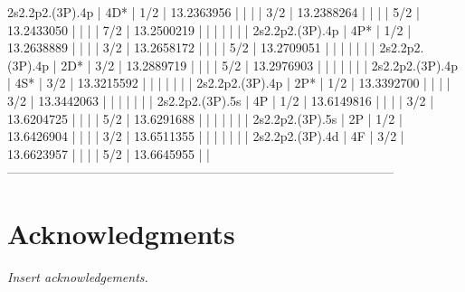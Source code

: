 \begin{table}
\begin{verbbox}
2s2.2p2.(3P).4p    | 4D*    |  1/2 |          13.2363956   |                    |          
                   |        |  3/2 |          13.2388264   |                    |          
                   |        |  5/2 |          13.2433050   |                    |          
                   |        |  7/2 |          13.2500219   |                    |          
                   |        |      |                       |                    |           
2s2.2p2.(3P).4p    | 4P*    |  1/2 |          13.2638889   |                    |          
                   |        |  3/2 |          13.2658172   |                    |          
                   |        |  5/2 |          13.2709051   |                    |          
                   |        |      |                       |                    |           
2s2.2p2.(3P).4p    | 2D*    |  3/2 |          13.2889719   |                    |          
                   |        |  5/2 |          13.2976903   |                    |          
                   |        |      |                       |                    |           
2s2.2p2.(3P).4p    | 4S*    |  3/2 |          13.3215592   |                    |          
                   |        |      |                       |                    |           
2s2.2p2.(3P).4p    | 2P*    |  1/2 |          13.3392700   |                    |          
                   |        |  3/2 |          13.3442063   |                    |          
                   |        |      |                       |                    |           
2s2.2p2.(3P).5s    | 4P     |  1/2 |          13.6149816   |                    |          
                   |        |  3/2 |          13.6204725   |                    |          
                   |        |  5/2 |          13.6291688   |                    |          
                   |        |      |                       |                    |           
2s2.2p2.(3P).5s    | 2P     |  1/2 |          13.6426904   |                    |          
                   |        |  3/2 |          13.6511355   |                    |          
                   |        |      |                       |                    |           
2s2.2p2.(3P).4d    | 4F     |  3/2 |          13.6623957   |                    |          
                   |        |  5/2 |          13.6645955   |                    |          
--------------------------------------------------------------------------------------------
\end{verbbox}
\restrictlinewidthbox{\theverbbox}
\end{table}
\clearpage

\section{Acknowledgments}
\textit{Insert acknowledgements.}




